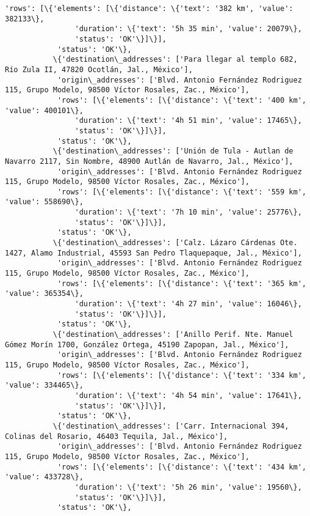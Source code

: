 \documentclass[11pt]{article}
\begin{document}
\begin{Verbatim}[commandchars=\\\{\}]
            'rows': [\{'elements': [\{'distance': \{'text': '382 km', 'value': 382133\},
                'duration': \{'text': '5h 35 min', 'value': 20079\},
                'status': 'OK'\}]\}],
            'status': 'OK'\},
           \{'destination\_addresses': ['Para llegar al templo 682, Río Zula II, 47820 Ocotlán, Jal., México'],
            'origin\_addresses': ['Blvd. Antonio Fernández Rodriguez 115, Grupo Modelo, 98500 Víctor Rosales, Zac., México'],
            'rows': [\{'elements': [\{'distance': \{'text': '400 km', 'value': 400101\},
                'duration': \{'text': '4h 51 min', 'value': 17465\},
                'status': 'OK'\}]\}],
            'status': 'OK'\},
           \{'destination\_addresses': ['Unión de Tula - Autlan de Navarro 2117, Sin Nombre, 48900 Autlán de Navarro, Jal., México'],
            'origin\_addresses': ['Blvd. Antonio Fernández Rodriguez 115, Grupo Modelo, 98500 Víctor Rosales, Zac., México'],
            'rows': [\{'elements': [\{'distance': \{'text': '559 km', 'value': 558690\},
                'duration': \{'text': '7h 10 min', 'value': 25776\},
                'status': 'OK'\}]\}],
            'status': 'OK'\},
           \{'destination\_addresses': ['Calz. Lázaro Cárdenas Ote. 1427, Alamo Industrial, 45593 San Pedro Tlaquepaque, Jal., México'],
            'origin\_addresses': ['Blvd. Antonio Fernández Rodriguez 115, Grupo Modelo, 98500 Víctor Rosales, Zac., México'],
            'rows': [\{'elements': [\{'distance': \{'text': '365 km', 'value': 365354\},
                'duration': \{'text': '4h 27 min', 'value': 16046\},
                'status': 'OK'\}]\}],
            'status': 'OK'\},
           \{'destination\_addresses': ['Anillo Perif. Nte. Manuel Gómez Morín 1700, González Ortega, 45190 Zapopan, Jal., México'],
            'origin\_addresses': ['Blvd. Antonio Fernández Rodriguez 115, Grupo Modelo, 98500 Víctor Rosales, Zac., México'],
            'rows': [\{'elements': [\{'distance': \{'text': '334 km', 'value': 334465\},
                'duration': \{'text': '4h 54 min', 'value': 17641\},
                'status': 'OK'\}]\}],
            'status': 'OK'\},
           \{'destination\_addresses': ['Carr. Internacional 394, Colinas del Rosario, 46403 Tequila, Jal., México'],
            'origin\_addresses': ['Blvd. Antonio Fernández Rodriguez 115, Grupo Modelo, 98500 Víctor Rosales, Zac., México'],
            'rows': [\{'elements': [\{'distance': \{'text': '434 km', 'value': 433728\},
                'duration': \{'text': '5h 26 min', 'value': 19560\},
                'status': 'OK'\}]\}],
            'status': 'OK'\},

\end{Verbatim}
\end{document}
